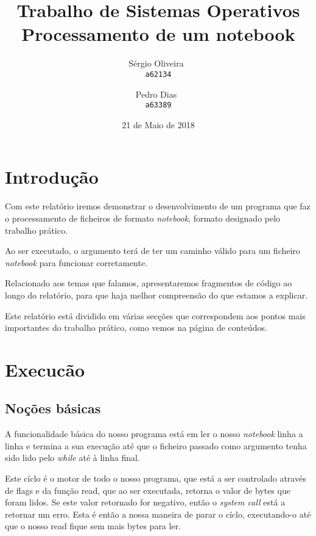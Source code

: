 \documentclass[11pt,a4paper]{report}
\begin{document}
\title{Trabalho de Sistemas Operativos\\Processamento de um notebook}
\author{
   Sérgio Oliveira~\\
   \texttt{a62134}
   \and
   Pedro Dias~\\
   \texttt{a63389}
}
\date{21 de Maio de 2018}
\maketitle
\raggedbottom
\pagebreak
\pagebreak


\tableofcontents
\pagebreak
\chapter{Introdução}
Com este relatório iremos demonstrar o desenvolvimento de um programa que faz o processamento de ficheiros de formato \textit{notebook}, formato designado pelo trabalho prático. 

Ao ser executado, o argumento terá de ter um caminho válido para um ficheiro \textit{notebook} para funcionar corretamente.

Relacionado aos temas que falamos, apresentaremos fragmentos de código ao longo do relatório, para que haja melhor compreensão do que estamos a explicar.

Este relatório está dividido em várias secções que correspondem aos pontos mais importantes do trabalho prático, como vemos na página de conteúdos.

\raggedbottom
\pagebreak


\chapter{Execucão}
\section{Noções básicas}

A funcionalidade básica do nosso programa está em ler o nosso \textit{notebook} linha a linha e termina a sua execução até que o ficheiro passado como argumento tenha sido lido pelo \textit{while} até à linha final.

Este cíclo é o motor de todo o nosso programa, que está a ser controlado através de flags e da função read, que ao ser executada, retorna o valor de bytes que foram lidos. Se este valor retornado for negativo, então o \textit{system call} está a retornar um erro. Esta é então a nossa maneira de parar o cíclo, executando-o até que o nosso read fique sem mais bytes para ler.
\end{document}

